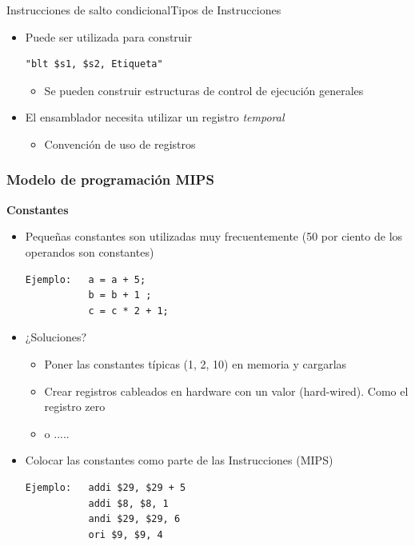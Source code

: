 \documentclass[aspectratio=169,compress]{beamer}
\begin{document}
\begin{footnotesize}
\begin{frame}[fragile]{Instrucciones de salto condicional}{Tipos de Instrucciones}
\begin{itemize}
\begin{verbatim}
Significado:      if $s1 < $s2 then
                      $t0 = 1
                  else
                      $t0 = 0
\end{verbatim}
\item Puede ser utilizada para construir \begin{verbatim}"blt $s1, $s2, Etiqueta"\end{verbatim}
\begin{itemize}
\item Se pueden construir estructuras de control de ejecución generales
\end{itemize}
\item El ensamblador necesita utilizar un registro \textit{temporal}
\begin{itemize}
\item Convención de uso de registros
\end{itemize}
\end{itemize}
\end{frame}



\begin{frame}[fragile]
\frametitle{Modelo de programación MIPS}
\begin{center}\textbf{Constantes}\end{center}

\begin{itemize}
\item Pequeñas constantes son utilizadas muy frecuentemente (50 por ciento de los operandos son constantes)
\begin{verbatim}
Ejemplo:   a = a + 5;
           b = b + 1 ;
           c = c * 2 + 1;
\end{verbatim}
\item ¿Soluciones? 
\begin{itemize}
\item Poner las constantes típicas (1, 2, 10) en memoria y cargarlas
\item Crear registros cableados en hardware con un valor (hard-wired). Como el registro zero
\item o .....
\end{itemize}
\item Colocar las constantes como parte de las Instrucciones (MIPS)
\begin{verbatim}
Ejemplo:   addi $29, $29 + 5
           addi $8, $8, 1
           andi $29, $29, 6
           ori $9, $9, 4
\end{verbatim}
\end{itemize}
\end{frame}





\end{footnotesize}
\end{document}
